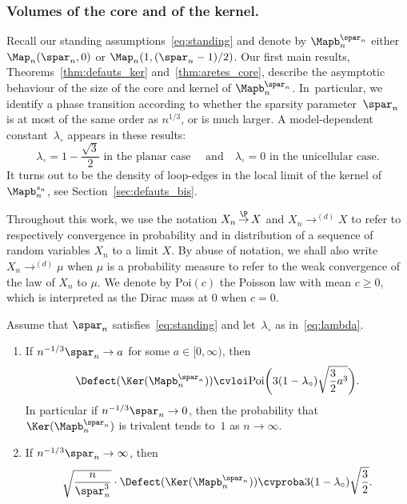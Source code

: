 \subsubsection*{Volumes of the core and of the kernel.}
Recall our standing assumptions~\eqref{eq:standing} and denote by $ \Mapb_{n}^{\spar_{n}}$ either $ \Map_{n}(\spar_{n},0)$ or $ \Map_{n}(1,(\spar_{n}-1)/2)$. Our first main results, Theorems~\ref{thm:defauts_ker} and~\ref{thm:aretes_core}, describe the asymptotic behaviour of the size of the core and kernel of $ \Mapb_{n}^{\spar_{n}}$. In~particular, we identify a phase transition according to whether the sparsity parameter~$\spar_{n}$ is at most of the same order as $n^{1/3}$, or is much larger.
A model-dependent constant~$\lambda_\circ$ appears in these results:
\begin{equation}\label{eq:lambda}
\lambda_\circ = 1-\frac{\sqrt{3}}{2}\text{ in the planar case }
\quad\text{and}\quad
\lambda_\circ = 0\text{ in the unicellular case}.
\end{equation}
It turns out to be the density of loop-edges in the local limit of the kernel of $ \Mapb_n^{s_n}$, see Section~\ref{sec:defauts_bis}.

Throughout this work, we use the notation $X_n \displaystyle\mathop{\to}^\P X$ and $X_n \displaystyle\mathop{\to}^{(d)} X$ to refer to respectively convergence in probability and in distribution of a sequence of random variables $X_n$ to a limit $X$. By abuse of notation, we shall also write $X_n \displaystyle\mathop{\to}^{(d)} \mu$ when $\mu$ is a probability measure to refer to the weak convergence of the law of $X_n$ to $\mu$.
We denote by $\mathrm{Poi}(c)$ the Poisson law with mean $c \ge 0$, which is interpreted as the Dirac mass at $0$ when $c=0$.

\begin{theorem}
\label{thm:defauts_ker}
Assume that $\spar_n$ satisfies~\eqref{eq:standing} and let~$\lambda_\circ$ as in~\eqref{eq:lambda}.
\begin{enumerate}
\item\label{thm:defauts_ker-Poisson} If $n^{-1/3} \spar_n \to a$ for some $a \in [0,\infty)$, then
\[
\Defect(\Ker(\Mapb_n^{\spar_{n}})) \cvloi \mathrm{Poi} \biggl(3 (1-\lambda_{\circ}) \sqrt{\frac{3}{2} a^3} \biggr).
\]
In particular if $n^{-1/3} \spar_n \to 0$, then the probability that $\Ker(\Mapb_n^{\spar_{n}})$ is trivalent tends to~$1$ as $n \to \infty$.

\item\label{thm:defauts_ker-Gaussien} If $n^{-1/3} \spar_n \to \infty$, then
\[
\sqrt{\frac{n}{\spar_n^{3}}} \cdot \Defect(\Ker(\Mapb_n^{\spar_{n}})) \cvproba 3 (1-\lambda_{\circ}) \sqrt{\frac{3}{2}}.
\]
\end{enumerate}
\end{theorem}

